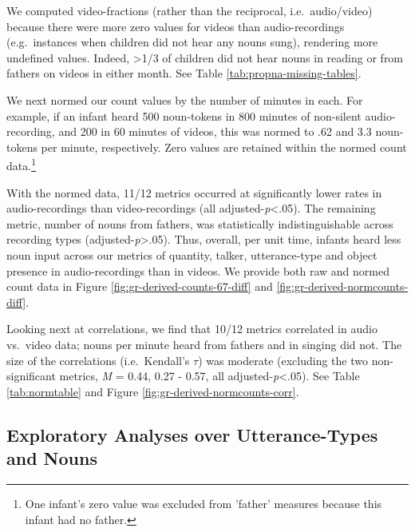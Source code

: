 \documentclass[man]{apa6}
\theoremstyle{definition}
\theoremstyle{definition}
\theoremstyle{definition}
\theoremstyle{remark}
\begin{document}
We computed video-fractions (rather than the reciprocal,
i.e.~audio/video) because there were more zero values for videos than
audio-recordings (e.g.~instances when children did not hear any nouns
sung), rendering more undefined values. Indeed, \textgreater{}1/3 of
children did not hear nouns in reading or from fathers on videos in
either month. See Table \ref{tab:propna-missing-tables}.

We next normed our count values by the number of minutes in each. For
example, if an infant heard 500 noun-tokens in 800 minutes of non-silent
audio-recording, and 200 in 60 minutes of videos, this was normed to .62
and 3.3 noun-tokens per minute, respectively. Zero values are retained
within the normed count
data.\footnote{One infant's zero value was excluded from 'father' measures because this infant had no father.}

With the normed data, 11/12 metrics occurred at significantly lower
rates in audio-recordings than video-recordings (all
adjusted-\emph{p}\textless{}.05). The remaining metric, number of nouns
from fathers, was statistically indistinguishable across recording types
(adjusted-\emph{p}\textgreater{}.05). Thus, overall, per unit time,
infants heard less noun input across our metrics of quantity, talker,
utterance-type and object presence in audio-recordings than in videos.
We provide both raw and normed count data in Figure
\ref{fig:gr-derived-counts-67-diff} and
\ref{fig:gr-derived-normcounts-diff}.

Looking next at correlations, we find that 10/12 metrics correlated in
audio vs.~video data; nouns per minute heard from fathers and in singing
did not. The size of the correlations (i.e.~Kendall's \(\tau\)) was
moderate (excluding the two non-significant metrics, \emph{M} = 0.44,
0.27 - 0.57, all adjusted-\emph{p}\textless{}.05). See Table
\ref{tab:normtable} and Figure \ref{fig:gr-derived-normcounts-corr}.

\subsection{Exploratory Analyses over Utterance-Types and
Nouns}\label{exploratory-analyses-over-utterance-types-and-nouns}
\end{document}
